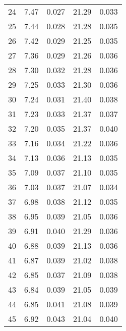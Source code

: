 \begin{table}
\begin{tabular}{c|ll|ll}
24 & 7.47 & 0.027 & 21.29 & 0.033 \\
25 & 7.44 & 0.028 & 21.28 & 0.035 \\
26 & 7.42 & 0.029 & 21.25 & 0.035 \\
27 & 7.36 & 0.029 & 21.26 & 0.036 \\
28 & 7.30 & 0.032 & 21.28 & 0.036 \\
29 & 7.25 & 0.033 & 21.30 & 0.036 \\
30 & 7.24 & 0.031 & 21.40 & 0.038 \\
31 & 7.23 & 0.033 & 21.37 & 0.037 \\
32 & 7.20 & 0.035 & 21.37 & 0.040 \\
33 & 7.16 & 0.034 & 21.22 & 0.036 \\
34 & 7.13 & 0.036 & 21.13 & 0.035 \\
35 & 7.09 & 0.037 & 21.10 & 0.035 \\
36 & 7.03 & 0.037 & 21.07 & 0.034 \\
37 & 6.98 & 0.038 & 21.12 & 0.035 \\
38 & 6.95 & 0.039 & 21.05 & 0.036 \\
39 & 6.91 & 0.040 & 21.29 & 0.036 \\
40 & 6.88 & 0.039 & 21.13 & 0.036 \\
41 & 6.87 & 0.039 & 21.02 & 0.038 \\
42 & 6.85 & 0.037 & 21.09 & 0.038 \\
43 & 6.84 & 0.039 & 21.05 & 0.039 \\
44 & 6.85 & 0.041 & 21.08 & 0.039 \\
45 & 6.92 & 0.043 & 21.04 & 0.040 \\
               \hline
        \end{tabular}
    \end{table}
    \clearpage

